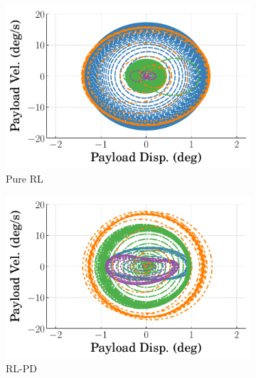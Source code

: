 %
\begin{figure}[h!]
  \centering
  \begin{subfigure}[b]{0.49\textwidth}
      \centering
      \includegraphics[width=\textwidth]{figures/figures_stability/time_responses_crane/dpcrane_pure_RL/dpcrane_pure_RL_payload_phase_plots.pdf}
      \caption{Pure RL}
      \label{subfig_chap3:dpcrane_pure_RL_phase_payload}
  \end{subfigure}
  \hfill
  \begin{subfigure}[b]{0.49\textwidth}
    \centering
    \includegraphics[width=\textwidth]{figures/figures_stability/time_responses_crane/dpcrane_cont_gain_sched/dpcrane_cont_gain_sched_payload_phase_plots.pdf}
    \caption{RL-PD}
    \label{subfig_chap3:dpcrane_RL_PD_phase_payload}
  \end{subfigure}
  \hfill
  \begin{subfigure}[b]{0.49\textwidth}

\end{subfigure}
\end{figure}
